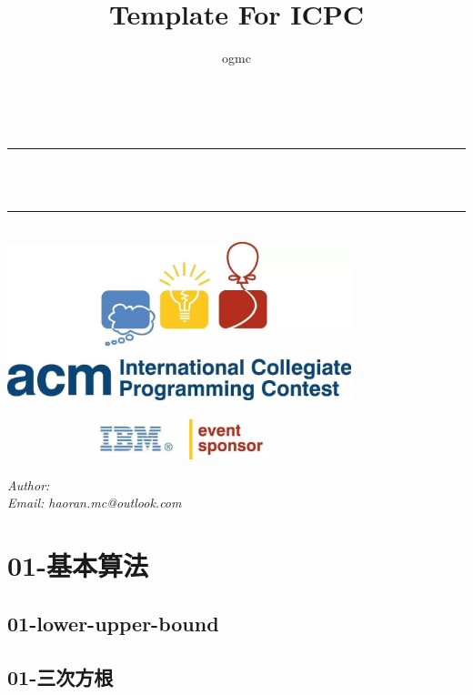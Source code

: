 \documentclass[10pt,a4paper]{article}
\title{Template For ICPC}
\author{ogmc}
\begin{document}
\begin{titlepage}
    \newcommand{\HRule}{\rule{\linewidth}{0.1mm}}
    \center
    \quad\\[1.5cm]
    \makeatletter
    \HRule \\[0.4cm]
    \emph{\fontsize{40pt}{\baselineskip}\selectfont \bfseries \@title}\\[0.2cm]
    \HRule \\[5cm]
    \includegraphics[width=10cm]{logo.jpeg}\\[1cm]
    \vskip 5cm
    \begin{minipage}{1\textwidth}
        \begin{center} \LARGE
            \emph{Author: \@author} \\
            \emph{Email: haoran.mc@outlook.com} \\
        \end{center}
    \end{minipage}
    \makeatother
    \vfill
    \thispagestyle{empty}
    \pagebreak
    \pagestyle{plain}
    \tableofcontents
\end{titlepage}
\section{01-基本算法}
\subsection{01-lower-upper-bound}

\subsection{01-三次方根}

\end{document}
